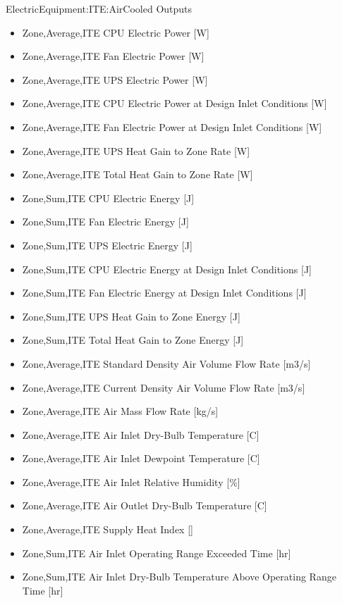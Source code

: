 ElectricEquipment:ITE:AirCooled Outputs

\begin{itemize}
\tightlist
\item
  Zone,Average,ITE CPU Electric Power {[}W{]}
\item
  Zone,Average,ITE Fan Electric Power {[}W{]}
\item
  Zone,Average,ITE UPS Electric Power {[}W{]}
\item
  Zone,Average,ITE CPU Electric Power at Design Inlet Conditions {[}W{]}
\item
  Zone,Average,ITE Fan Electric Power at Design Inlet Conditions {[}W{]}
\item
  Zone,Average,ITE UPS Heat Gain to Zone Rate {[}W{]}
\item
  Zone,Average,ITE Total Heat Gain to Zone Rate {[}W{]}
\item
  Zone,Sum,ITE CPU Electric Energy {[}J{]}
\item
  Zone,Sum,ITE Fan Electric Energy {[}J{]}
\item
  Zone,Sum,ITE UPS Electric Energy {[}J{]}
\item
  Zone,Sum,ITE CPU Electric Energy at Design Inlet Conditions {[}J{]}
\item
  Zone,Sum,ITE Fan Electric Energy at Design Inlet Conditions {[}J{]}
\item
  Zone,Sum,ITE UPS Heat Gain to Zone Energy {[}J{]}
\item
  Zone,Sum,ITE Total Heat Gain to Zone Energy {[}J{]}
\item
  Zone,Average,ITE Standard Density Air Volume Flow Rate {[}m3/s{]}
\item
  Zone,Average,ITE Current Density Air Volume Flow Rate {[}m3/s{]}
\item
  Zone,Average,ITE Air Mass Flow Rate {[}kg/s{]}
\item
  Zone,Average,ITE Air Inlet Dry-Bulb Temperature {[}C{]}
\item
  Zone,Average,ITE Air Inlet Dewpoint Temperature {[}C{]}
\item
  Zone,Average,ITE Air Inlet Relative Humidity {[}\%{]}
\item
  Zone,Average,ITE Air Outlet Dry-Bulb Temperature {[}C{]}
\item
  Zone,Average,ITE Supply Heat Index {[]}
\item
  Zone,Sum,ITE Air Inlet Operating Range Exceeded Time {[}hr{]}
\item
  Zone,Sum,ITE Air Inlet Dry-Bulb Temperature Above Operating Range Time {[}hr{]}

\end{itemize}
